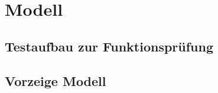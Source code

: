 
\chapter{Modell}
\label{sec:modelle}

\section{Testaufbau zur Funktionsprüfung}
\label{sec:Bsp}


\section{Vorzeige Modell}
\label{sec:Bsp}
